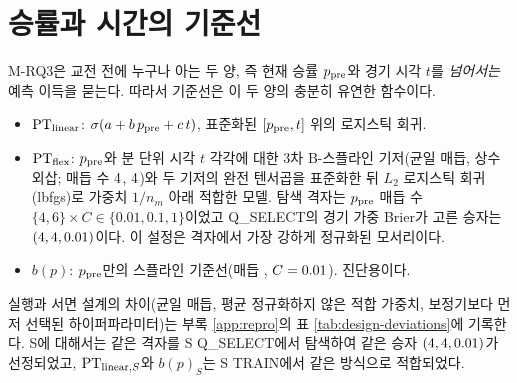 \section{승률과 시간의 기준선}
\label{sec:pred-baselines}

M-RQ3은 교전 전에 누구나 아는 두 양, 즉 현재 승률 $p_{\mathrm{pre}}$와 경기 시각 $t$를 \emph{넘어서는} 예측 이득을 묻는다. 따라서 기준선은 이 두 양의 충분히 유연한 함수이다.

\begin{itemize}[leftmargin=1.5em]
  \item $\mathrm{PT}_{\mathrm{linear}}$: $\sigma(a + b\,p_{\mathrm{pre}} + c\,t)$, 표준화된 $[p_{\mathrm{pre}}, t]$ 위의 로지스틱 회귀.
  \item $\mathrm{PT}_{\mathrm{flex}}$: $p_{\mathrm{pre}}$와 분 단위 시각 $t$ 각각에 대한 3차 B-스플라인 기저(균일 매듭, 상수 외삽; 매듭 수 $4$, $4$)와 두 기저의 완전 텐서곱을 표준화한 뒤 $L_2$ 로지스틱 회귀(lbfgs)로 가중치 $1/n_m$ 아래 적합한 모델. 탐색 격자는 $p_{\mathrm{pre}}$ 매듭 수 $\{4, 6\} \times C \in \{0.01, 0.1, 1\}$이었고 Q\_SELECT의 경기 가중 Brier가 고른 승자는 $(4, 4, 0.01)$이다. 이 설정은 격자에서 가장 강하게 정규화된 모서리이다.
  \item $b(p)$: $p_{\mathrm{pre}}$만의 스플라인 기준선(매듭 \knotsPonly, $C = 0.01$). 진단용이다.
\end{itemize}

실행과 서면 설계의 차이(균일 매듭, 평균 정규화하지 않은 적합 가중치, 보정기보다 먼저 선택된 하이퍼파라미터)는 부록 \ref{app:repro}의 표 \ref{tab:design-deviations}에 기록한다. S에 대해서는 같은 격자를 S Q\_SELECT에서 탐색하여 같은 승자 $(4, 4, 0.01)$가 선정되었고, $\mathrm{PT}_{\mathrm{linear},S}$와 $b(p)_S$는 S TRAIN에서 같은 방식으로 적합되었다.
